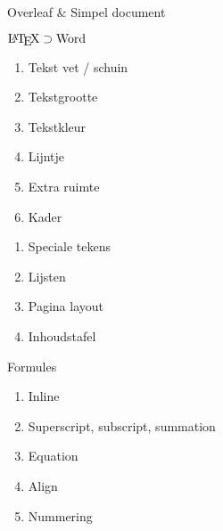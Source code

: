 \documentclass[handout]{beamer}
\begin{document}
\begin{frame}
	Overleaf \& Simpel document
\end{frame}

\begin{frame}{$ \text{\LaTeX}\supset\text{Word} $}
	\begin{enumerate}
		\item Tekst vet / schuin
		\item Tekstgrootte
		\item Tekstkleur
		\item Lijntje
		\item Extra ruimte
		\item Kader
	\end{enumerate}
\end{frame}

\begin{frame}
	\begin{enumerate}
		\item Speciale tekens
		\item Lijsten
		\item Pagina layout
		\item Inhoudstafel
	\end{enumerate}
\end{frame}

\begin{frame}{Formules}
	\begin{enumerate}
		\item Inline
		\item Superscript, subscript, summation
		\item Equation
		\item Align
		\item Nummering
	\end{enumerate}
\end{frame}

\def\Zphantomconceal#1#2{%
	\only<#2->{\rlap{#1}}\phantom{#1}%
}

\def\phantomconceal#1#2{%
	\Zphantomconceal{#1}{#2}%
}

\newcommand\hideformula[2][2]{%
	\hll|$| \phantomconceal{\hll|#2|}{#1} \hll|$|
}

\newcount\showcount

\newcommand\showformula[2]{%
	#1 & \global\showcount=\numexpr\showcount + 1\relax
	\expandafter\hideformula\expandafter[\the\showcount]{#2}%
}
\end{document}
